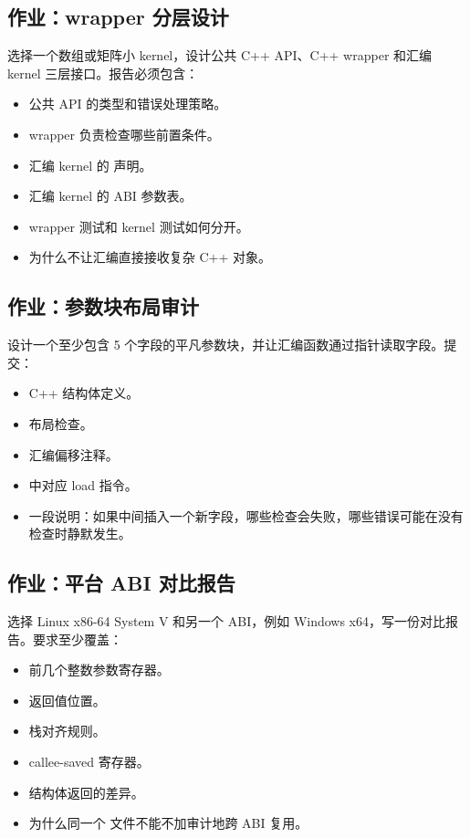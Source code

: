 \begin{exercisebox}
\subsection*{作业：wrapper 分层设计}

选择一个数组或矩阵小 kernel，设计公共 C++ API、C++ wrapper 和汇编 kernel 三层接口。报告必须包含：

\begin{itemize}
  \item 公共 API 的类型和错误处理策略。
  \item wrapper 负责检查哪些前置条件。
  \item 汇编 kernel 的  声明。
  \item 汇编 kernel 的 ABI 参数表。
  \item wrapper 测试和 kernel 测试如何分开。
  \item 为什么不让汇编直接接收复杂 C++ 对象。
\end{itemize}

\subsection*{作业：参数块布局审计}

设计一个至少包含 5 个字段的平凡参数块，并让汇编函数通过指针读取字段。提交：

\begin{itemize}
  \item C++ 结构体定义。
  \item {} 布局检查。
  \item 汇编偏移注释。
  \item {} 中对应 load 指令。
  \item 一段说明：如果中间插入一个新字段，哪些检查会失败，哪些错误可能在没有检查时静默发生。
\end{itemize}

\subsection*{作业：平台 ABI 对比报告}

选择 Linux x86-64 System V 和另一个 ABI，例如 Windows x64，写一份对比报告。要求至少覆盖：

\begin{itemize}
  \item 前几个整数参数寄存器。
  \item 返回值位置。
  \item 栈对齐规则。
  \item callee-saved 寄存器。
  \item 结构体返回的差异。
  \item 为什么同一个  文件不能不加审计地跨 ABI 复用。
\end{itemize}


\end{exercisebox}
